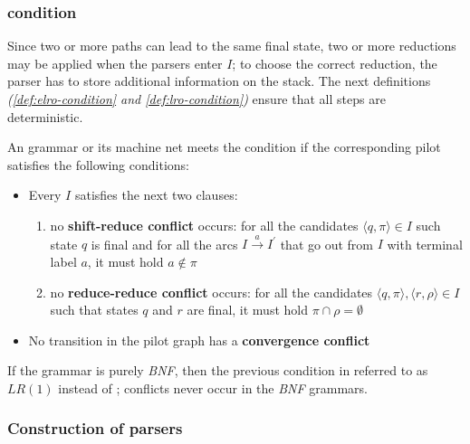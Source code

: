 \documentclass[english]{article}
\begin{document}
\subsubsection[ELR(1) condition]{\elro condition}
\label{sec:elro-condition}

Since two or more paths can lead to the same final state, two or more reductions may be applied when the parsers enter \mstate \(I\);
to choose the correct reduction, the parser has to store additional information on the stack.
The next definitions \textit{(\ref{def:elro-condition} and \ref{def:lro-condition})} ensure that all steps are deterministic.

\begin{definition}
  \label{def:elro-condition}
  An \EBNF grammar or its machine net meets the condition \textbf{\elro} if the corresponding pilot satisfies the following conditions:
  \begin{itemize}
    \item Every \mstate \(I\) satisfies the next two clauses:
          \begin{enumerate}
            \item no \textbf{shift-reduce conflict} occurs: for all the candidates \(\langle q, \pi \rangle \in I\) such state \(q\) is final and for all the arcs \(I \xrightarrow{a} I^\prime\) that go out from \(I\) with terminal label \(a\), it must hold \(a \notin \pi\)
            \item no \textbf{reduce-reduce conflict} occurs: for all the candidates \(\langle q, \pi \rangle, \langle r, \rho \rangle \in I\) such that states \(q\) and \(r\) are final, it must hold \(\pi \cap \rho = \emptyset\)
          \end{enumerate}
    \item No transition in the pilot graph has a \textbf{convergence conflict}
  \end{itemize}
\end{definition}

\begin{definition}[\(\textit{LR}(1)\)]
  \label{def:lro-condition}
  If the grammar is purely \textit{BNF}, then the previous condition in referred to as \(\textit{LR}(1)\) instead of \elro;
  conflicts never occur in the \textit{BNF} grammars.
\end{definition}

\subsubsection[Construction of ELR(1) parser]{Construction of \elro parsers}
\end{document}
